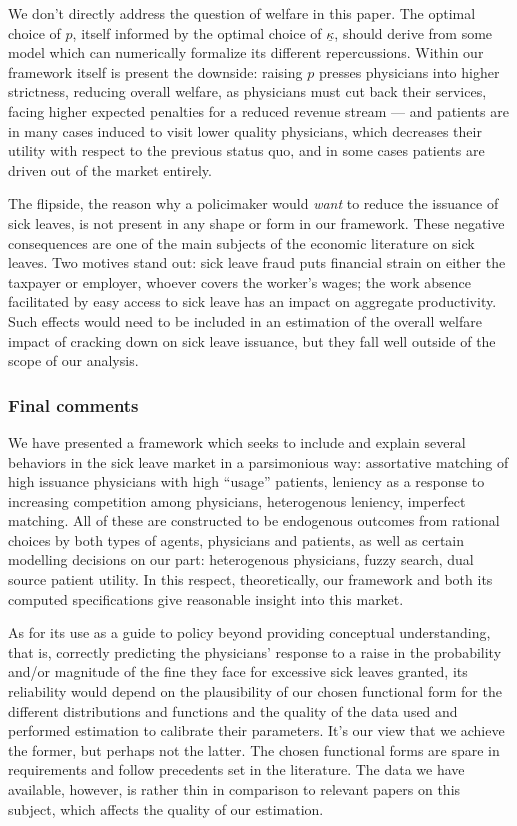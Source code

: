 \documentclass[../main.tex]{subfiles}
\begin{document}
We don't directly address the question of welfare in this paper. The optimal choice of $p$, itself informed by the optimal choice of $\underline{\kappa}$, should derive from some model which can numerically formalize its different repercussions. Within our framework itself is present the downside: raising $p$ presses physicians into higher strictness, reducing overall welfare, as physicians must cut back their services, facing higher expected penalties for a reduced revenue stream — and patients are in many cases induced to visit lower quality physicians, which decreases their utility with respect to the previous status quo, and in some cases patients are driven out of the market entirely.

The flipside, the reason why a policimaker would \textit{want} to reduce the issuance of sick leaves, is not present in any shape or form in our framework. These negative consequences are one of the main subjects of the economic literature on sick leaves. Two motives stand out: sick leave fraud puts financial strain on either the taxpayer or employer, whoever covers the worker's wages; the work absence facilitated by easy access to sick leave has an impact on aggregate productivity. Such effects would need to be included in an estimation of the overall welfare impact of cracking down on sick leave issuance, but they fall well outside of the scope of our analysis.

\subsubsection*{Final comments}

We have presented a framework which seeks to include and explain several behaviors in the sick leave market in a parsimonious way: assortative matching of high issuance physicians with high ``usage'' patients, leniency as a response to increasing competition among physicians, heterogenous leniency, imperfect matching. All of these are constructed to be endogenous outcomes from rational choices by both types of agents, physicians and patients, as well as certain modelling decisions on our part: heterogenous physicians, fuzzy search, dual source patient utility. In this respect, theoretically, our framework and both its computed specifications give reasonable insight into this market.

As for its use as a guide to policy beyond providing conceptual understanding, that is, correctly predicting the physicians' response to a raise in the probability and/or magnitude of the fine they face for excessive sick leaves granted, its reliability would depend on the plausibility of our chosen functional form for the different distributions and functions and the quality of the data used and performed estimation to calibrate their parameters. It's our view that we achieve the former, but perhaps not the latter. The chosen functional forms are spare in requirements and follow precedents set in the literature. The data we have available, however, is rather thin in comparison to relevant papers on this subject, which affects the quality of our estimation.
\end{document}
